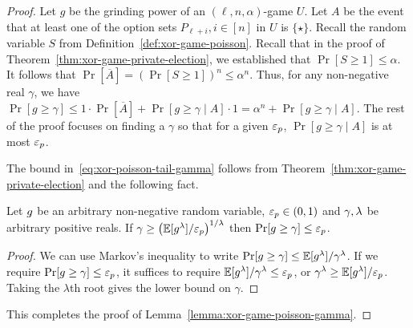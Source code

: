   \begin{proof}
      Let $g$ be the grinding power of an $(\ell, n, \alpha)$-game $U$.
      Let $A$ be the event that 
      at least one of the option sets $P_{\ell + i}, i \in [n]$ in $U$ is $\{\star\}$. 
      Recall the random variable $S$ from Definition~\ref{def:xor-game-poisson}. 
      Recall that in the proof of Theorem~\ref{thm:xor-game-private-election}, 
      we established that $\Pr[S \geq 1] \leq \alpha$. 
      It follows that $\Pr[\overline{A}] = (\Pr[S \geq 1])^n \leq \alpha^n$. 
      Thus, for any non-negative real $\gamma$, 
      we have 
      $
      \Pr[g \geq \gamma] 
      \leq 1 \cdot \Pr[\overline{A}] + \Pr[g \geq \gamma \mid A] \cdot 1
      = \alpha^n + \Pr[g \geq \gamma \mid A]
      $. 
      The rest of the proof focuses on finding a $\gamma$ so that 
      for a given $\mathsf{\varepsilon}_p$, 
      $\Pr[g \geq \gamma \mid A]$ is at most $\mathsf{\varepsilon}_p$. 

      The bound in~\eqref{eq:xor-poisson-tail-gamma} follows from 
      Theorem~\ref{thm:xor-game-private-election} and the following fact.

      \begin{fact}\label{fact:grinding-max}
          Let $g$ be an arbitrary non-negative random variable, 
          $\mathsf{\varepsilon}_p \in (0, 1)$ and 
          $\gamma, \lambda$ be arbitrary positive reals. 
          If $
              \gamma \geq \left( \operatorname{\mathbb{E}}[g^\lambda]/\mathsf{\varepsilon}_p \right)^{1/\lambda}
          $
          then $\Pr[g \geq \gamma] \leq \mathsf{\varepsilon}_p$.    
      \end{fact}
      \begin{proof}
          We can use Markov's inequality to write 
          $
              \Pr[g \geq \gamma] \leq \operatorname{\mathbb{E}}[g^\lambda]/\gamma^\lambda
          $.
          If we require $\Pr[g \geq \gamma] \leq \mathsf{\varepsilon}_p$, 
          it suffices to require 
          $\operatorname{\mathbb{E}}[g^\lambda]/\gamma^\lambda \leq \mathsf{\varepsilon}_p$, or
          $\gamma^\lambda \geq \operatorname{\mathbb{E}}[g^\lambda]/\mathsf{\varepsilon}_p$. 
          Taking the $\lambda$th root gives the lower bound on $\gamma$.
      \end{proof}
      This completes the proof of Lemma~\ref{lemma:xor-game-poisson-gamma}.
  \end{proof}


